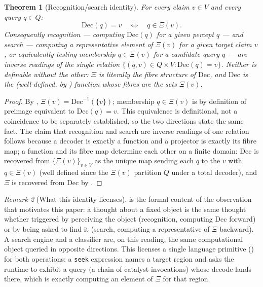 \documentclass[11pt,twocolumn,a4paper]{article}
\theoremstyle{thmstyle}
\newtheorem{theorem}{Theorem}[section]
\theoremstyle{definition}
\theoremstyle{remark}
\newtheorem{remark}[theorem]{Remark}
\newcommand{\V}{V}
\newcommand{\Proj}{\Xi}
\begin{document}
\begin{theorem}[Recognition/search identity]
\label{thm:recognition-search}
For every claim $v\in\V$ and every query $q\in Q$:
\[
\mathrm{Dec}(q)=v \quad\Longleftrightarrow\quad q\in\Proj(v).
\]
Consequently \emph{recognition} --- computing $\mathrm{Dec}(q)$ for a given
percept $q$ --- and \emph{search} --- computing a representative element
of $\Proj(v)$ for a given target claim $v$, or equivalently testing
membership $q\in\Proj(v)$ for a candidate query $q$ --- are inverse
readings of the single relation
$\{(q,v)\in Q\times\V : \mathrm{Dec}(q)=v\}$. Neither is definable without
the other: $\Proj$ is literally the fibre structure of $\mathrm{Dec}$, and
$\mathrm{Dec}$ is the (well-defined, by ) function
whose fibres are the sets $\Proj(v)$.
\end{theorem}

\begin{proof}
By , $\Proj(v)=\mathrm{Dec}^{-1}(\{v\})$; membership
$q\in\Proj(v)$ is by definition of preimage equivalent to
$\mathrm{Dec}(q)=v$. This equivalence is definitional, not a coincidence to
be separately established, so the two directions state the same fact. The
claim that recognition and search are inverse readings of one relation
follows because a decoder is exactly a function and a projector is exactly
its fibre map; a function and its fibre map determine each other on a
finite domain: $\mathrm{Dec}$ is recovered from $\{\Proj(v)\}_{v\in\V}$ as
the unique map sending each $q$ to the $v$ with $q\in\Proj(v)$ (well
defined since the $\Proj(v)$ partition $Q$ under a total decoder), and
$\Proj$ is recovered from $\mathrm{Dec}$ by .
\end{proof}

\begin{remark}[What this identity licenses]
\label{rem:identity-licenses}
 is the formal content of the observation
that motivates this paper: a thought about a fixed object is the same
thought whether triggered by perceiving the object (recognition, computing
$\mathrm{Dec}$ forward) or by being asked to find it (search, computing a
representative of $\Proj$ backward). A search engine and a classifier are,
on this reading, the same computational object queried in opposite
directions. This licenses a single language primitive
() for both operations: a \texttt{seek} expression names
a target region and asks the runtime to exhibit a query (a chain of
catalyst invocations) whose decode lands there, which is exactly computing
an element of $\Proj$ for that region.
\end{remark}
\end{document}
